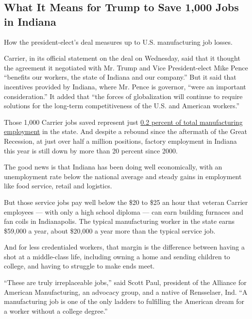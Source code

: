\hypertarget{what-it-means-for-trump-to-save-1000-jobs-in-indiana}{%
\subsection{What It Means for Trump to Save 1,000 Jobs in
Indiana}\label{what-it-means-for-trump-to-save-1000-jobs-in-indiana}}

How the president-elect's deal measures up to U.S. manufacturing job
losses.

Carrier, in its official statement on the deal on Wednesday, said that
it thought the agreement it negotiated with Mr. Trump and Vice
President-elect Mike Pence ``benefits our workers, the state of Indiana
and our company.'' But it said that incentives provided by Indiana,
where Mr. Pence is governor, ``were an important consideration.'' It
added that ``the forces of globalization will continue to require
solutions for the long-term competitiveness of the U.S. and American
workers.''

Those 1,000 Carrier jobs saved represent just
\href{http://www.nytimes.com/interactive/2016/11/30/us/politics/trump-manufacturing-jobs-indiana-carrier.html}{0.2
percent of total manufacturing employment} in the state. And despite a
rebound since the aftermath of the Great Recession, at just over half a
million positions, factory employment in Indiana this year is still down
by more than 20 percent since 2000.

The good news is that Indiana has been doing well economically, with an
unemployment rate below the national average and steady gains in
employment like food service, retail and logistics.

But those service jobs pay well below the \$20 to \$25 an hour that
veteran Carrier employees --- with only a high school diploma --- can
earn building furnaces and fan coils in Indianapolis. The typical
manufacturing worker in the state earns \$59,000 a year, about \$20,000
a year more than the typical service job.

And for less credentialed workers, that margin is the difference between
having a shot at a middle-class life, including owning a home and
sending children to college, and having to struggle to make ends meet.

``These are truly irreplaceable jobs,'' said Scott Paul, president of
the Alliance for American Manufacturing, an advocacy group, and a native
of Rensselaer, Ind. ``A manufacturing job is one of the only ladders to
fulfilling the American dream for a worker without a college degree.''

